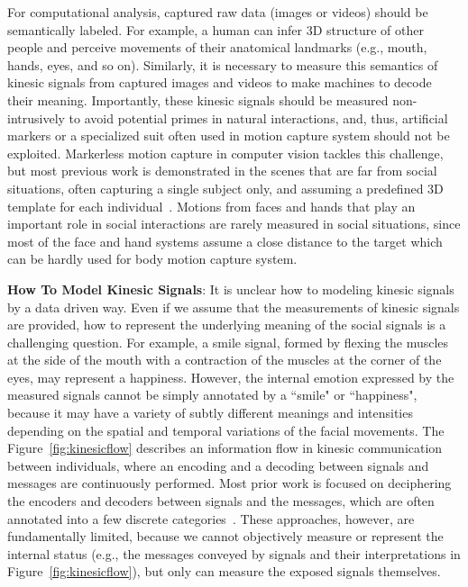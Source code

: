 For computational analysis, captured raw data (images or videos) should be semantically labeled. For example, a human can infer 3D structure of other people and perceive movements of their anatomical landmarks (e.g., mouth, hands, eyes, and so on). Similarly, it is necessary to measure this semantics of kinesic signals from captured images and videos to make machines to decode their meaning. Importantly, these kinesic signals should be measured non-intrusively to avoid potential primes in natural interactions, and, thus, artificial markers or a specialized suit often used in motion capture system should not be exploited. Markerless motion capture in computer vision tackles this challenge, but most previous work is demonstrated in the scenes that are far from social situations, often capturing a single subject only, and assuming a predefined 3D template for each individual~\cite{Gall-09, Vlasic-08, Brox-10, Stoll-11, deAguiar-2008, Vlasic-2008}. Motions from faces and hands that play an important role in social interactions are rarely measured in social situations, since most of the face and hand systems assume a close distance to the target which can be hardly used for body motion capture system. 

\noindent \textbf{How To Model Kinesic Signals}: 
It is unclear how to modeling kinesic signals by a data driven way. Even if we assume that the measurements of kinesic signals are provided, how to represent the underlying meaning of the social signals is a challenging question. For example, a smile signal, formed by flexing the muscles at the side of the mouth with a contraction of the muscles at the corner of the eyes, may represent a happiness. However, the internal emotion expressed by the measured signals cannot be simply annotated by a ``smile" or ``happiness", because it may have a variety of subtly different meanings and intensities depending on the spatial and temporal variations of the facial movements. The Figure~\ref{fig:kinesicflow} describes an information flow in kinesic communication between individuals, where an encoding and a decoding between signals and messages are continuously performed. Most prior work is focused on deciphering the encoders and decoders between signals and the messages, which are often annotated into a few discrete categories~\cite{pantic2000automatic,cowie2001emotion,shan2009facial,cowie2001emotion,gunes2006bimodal}. These approaches, however, are fundamentally limited, because we cannot objectively measure or represent the internal status (e.g., the messages conveyed by signals and their interpretations in Figure~\ref{fig:kinesicflow}), but only can measure the exposed signals themselves.

